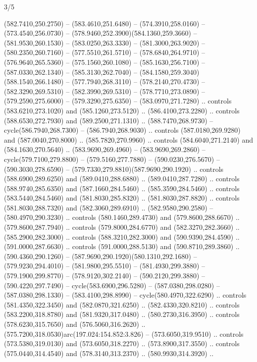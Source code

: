 \begin{flagdescription}{3/5}
\begin{scope}[shift={(0.5\flaglength,0.5\flagwidth)},scale=\flagwidth/1075]
\begin{scope}[y=0.80pt, x=0.80pt, yscale=-2.37, xscale=2.37,xshift=-402,yshift=-230.4]
  (582.7410,250.2750) -- (583.4610,251.6480) -- (574.3910,258.0160) --
  (573.4540,256.0730) -- (578.9460,252.3900)(584.1360,259.3660) --
  (581.9530,260.1530) -- (583.0250,263.3330) -- (581.3000,263.9020) --
  (580.2350,260.7160) -- (577.5510,261.5710) -- (578.6840,264.9710) --
  (576.9640,265.5360) -- (575.1560,260.1080) -- (585.1630,256.7100) --
  (587.0330,262.1340) -- (585.3130,262.7040) --
  (584.1580,259.3040)(588.1540,266.1480) -- (577.7940,268.3110) --
  (578.2140,270.4730) -- (582.3290,269.5310) -- (582.3990,269.5310) --
  (578.7710,273.0890) -- (579.2590,275.6000) -- (579.3290,275.6350) --
  (583.0970,271.7280) .. controls (583.6210,273.1020) and (585.1260,273.5120) ..
  (586.4100,273.2280) .. controls (588.6530,272.7930) and (589.2500,271.1310) ..
  (588.7470,268.9730) -- cycle(586.7940,268.7300) -- (586.7940,268.9030) ..
  controls (587.0180,269.9280) and (587.0040,270.8000) .. (585.7820,270.9960) ..
  controls (584.6040,271.2140) and (584.1630,270.5640) .. (583.9690,269.4960) --
  (583.9690,269.2860) -- cycle(579.7100,279.8800) -- (579.5160,277.7880) --
  (590.0230,276.5670) -- (590.3030,278.6590) --
  (579.7330,279.8810)(587.9690,290.1920) .. controls (588.6900,289.6250) and
  (589.0410,288.6880) .. (589.0410,287.7280) .. controls (588.9740,285.6350) and
  (587.1660,284.5460) .. (585.3590,284.5460) .. controls (583.5440,284.5460) and
  (581.8030,285.8320) .. (581.8030,287.8820) .. controls (581.8030,288.7320) and
  (582.3060,289.6910) .. (582.9580,290.2580) -- (580.4970,290.3230) .. controls
  (580.1460,289.4730) and (579.8600,288.6670) .. (579.8600,287.7940) .. controls
  (579.8000,284.6770) and (582.3270,282.3660) .. (585.2900,282.3000) .. controls
  (588.3210,282.3000) and (590.9390,284.4590) .. (591.0000,287.6630) .. controls
  (591.0000,288.5130) and (590.8710,289.3860) .. (590.4360,290.1260) --
  (587.9690,290.1920)(580.1310,292.1680) -- (579.9230,294.4010) --
  (581.9800,295.5510) -- (581.4930,299.3880) -- (579.1900,299.8770) --
  (578.9120,302.2140) -- (590.2120,299.3880) -- (590.4220,297.7490) --
  cycle(583.6900,296.5280) -- (587.0380,298.0280) -- (587.0380,298.1330) --
  (583.4100,298.8990) -- cycle(580.4970,322.6290) .. controls
  (581.4350,322.3450) and (582.0870,321.6250) .. (582.4330,320.8210) .. controls
  (583.2200,318.8780) and (581.9320,317.0480) .. (580.2730,316.3950) .. controls
  (578.6230,315.7650) and (576.5060,316.2620) ..
  (575.7200,318.0530)arc(197.024:154.852:3.826) -- (573.6050,319.9510) ..
  controls (573.5380,319.0130) and (573.6050,318.2270) .. (573.8900,317.3550) ..
  controls (575.0440,314.4540) and (578.3140,313.2370) .. (580.9930,314.3920) ..

\end{scope}
\end{scope}
\end{flagdescription}

